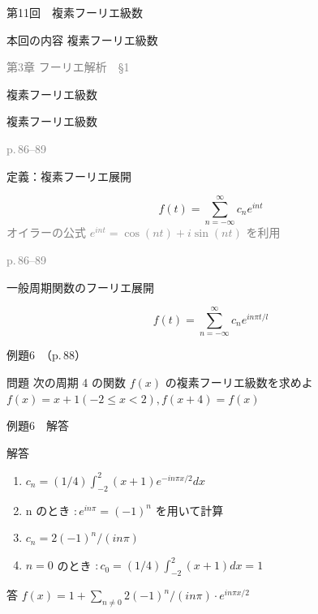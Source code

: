\documentclass[aspectratio=43,professionalfonts,handout]{beamer}
\begin{document}
\begin{frame}{第11回　複素フーリエ級数}
  \begin{block}{本回の内容}
  複素フーリエ級数
  \end{block}
  \vfill\hfill{\scriptsize \textcolor{gray}{第3章 フーリエ解析　§1}}
\end{frame}

\begin{frame}{複素フーリエ級数}
  \begin{block}{}
  {\large 複素フーリエ級数}
  \end{block}
  \vfill\hfill{\scriptsize \textcolor{gray}{p.\,86--89}}
\end{frame}

\begin{frame}{定義：複素フーリエ展開}
  \begin{block}{}
  \[
    f(t) = \sum_{n=-\infty}^{\infty} c_{n} e^{int}
  \]
  {\footnotesize \textcolor{gray}{オイラーの公式 $e^{int} = \cos(nt) + i \sin(nt)$ を利用}}
  \end{block}
  \vfill\hfill{\scriptsize \textcolor{gray}{p.\,86--89}}
\end{frame}

\begin{frame}{一般周期関数のフーリエ展開}
  \begin{block}{}
  \[
    f(t) = \sum_{n=-\infty}^{\infty} c_{n} e^{in\pi t/l}
  \]
  \end{block}
\end{frame}

\begin{frame}{例題6　（p.\,88）}
  \begin{exampleblock}{問題}
    次の周期 4 の関数 $f(x)$ の複素フーリエ級数を求めよ\\[2pt]
    $f(x) = x + 1  (-2 \leq x < 2),  f(x+4) = f(x)$\\[2pt]
  \end{exampleblock}
\end{frame}

\begin{frame}{例題6　解答}
  \begin{exampleblock}{解答}
  \begin{enumerate}[1.]
    \item[] $c_{n} = (1/4) \int_{-2}^{2} (x+1) e^{-in\pi x/2} dx$
    \item[] n  のとき $: e^{in\pi} = (-1)^n$ を用いて計算
    \item[] $c_{n} = 2(-1)^n / (in\pi)$
    \item[] $n = 0$ のとき $: c_{0} = (1/4)\int_{-2}^{2}(x+1)dx = 1$
  \end{enumerate}
  \end{exampleblock}
  \begin{alertblock}{答}
    $f(x) = 1 + \sum_{n\neq0} 2(-1)^n/(in\pi) \cdot e^{in\pi x/2}$
  \end{alertblock}
\end{frame}
\end{document}
